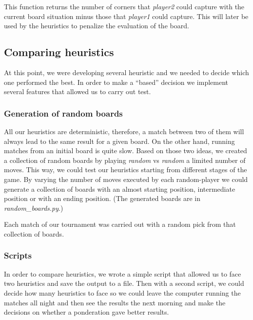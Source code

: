 \documentclass{article}
\begin{document}
This function returns the number of corners that \textit{player2} could capture with the current board situation minus those that \textit{player1} could capture. This will later be used by the heuristics to penalize the evaluation of the board.

\subsection{Comparing heuristics}

At this point, we were developing several heuristic and we needed to decide which one performed the best. In order to make a ``based'' decision we implement several features that allowed us to carry out test.

\subsubsection{Generation of random boards}

All our heuristics are deterministic, therefore, a match between two of them will always lead to the same result for a given board. On the other hand, running matches from an initial board is quite slow. Based on those two ideas, we created a collection of random boards by playing \textit{random} vs \textit{random} a limited number of moves. This way, we could test our heuristics starting from different stages of the game. By varying the number of moves executed by each random-player we could generate a collection of boards with an almost starting position, intermediate position or with an ending position. (The generated boards are in \emph{random\_boards.py}.)

Each match of our tournament was carried out with a random pick from that collection of boards. 

\subsubsection{Scripts}\label{scripts_compare}

In order to compare heuristics, we wrote a simple script that allowed us to face two heuristics and save the output to a file. Then with a second script, we could decide how many heuristics to face so we could leave the computer running the matches all night and then see the results the next morning and make the decisions on whether a ponderation gave better results.
\end{document}
